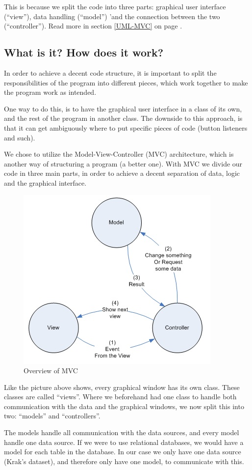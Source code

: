 This is because we split the code into three parts: graphical user interface 
(``view''), data handling (``model'') 'and the connection between the two 
(``controller''). Read more in section \ref{UML-MVC} on page \pageref{UML-MVC}.

\subsection{What is it? How does it work?}
In order to achieve a decent code structure, it is important to split the 
responsibilities of the program into different pieces, which work together 
to make the program work as intended.

One way to do this, is to have the graphical user interface in a class of its
own, and the rest of the program in another class. The downside to this
approach, is that it can get ambiguously where to put specific pieces of code
(button listeners and such).

We chose to utilize the Model-View-Controller (MVC) architecture, which is
another way of structuring a program (a better one). With MVC we divide our code
in three main parts, in order to achieve a decent separation of data, logic and
the graphical interface.

\begin{figure}[h!]
\centering
\includegraphics[width=0.5\linewidth]{images/mvc}
\caption{Overview of MVC}
\label{mvc-overview}
\end{figure}

Like the picture above shows, every graphical window has its own class. These
classes are called ``views''. Where we beforehand had one class to handle both
communication with the data and the graphical windows, we now split this into
two: ``models'' and ``controllers''.

The models handle all communication with the data sources, and every model
handle one data source. If we were to use relational databases, we would have a
model for each table in the database. In our case we only have one data source
(Krak's dataset), and therefore only have one model, to communicate with this.

